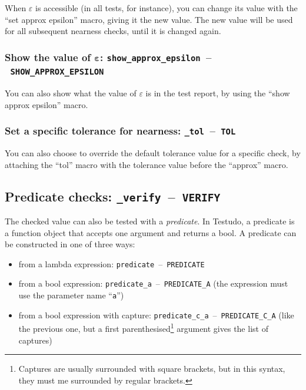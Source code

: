 \documentclass[twoside, a4paper, article]{memoir}
\newcommand*\testudocolor{\color{red!80!blue}}
\newcommand*\testudo[1]{\texttt{\testudocolor{}#1}}
\newcommand*\testudopair[2]{\testudo{#1}~--~\testudo{#2}}
\newcommand\subsectiontestudopair[3]{%
  \subsection[#1]{#1: \testudopair{#2}{#3}}}
\newcommand\subsubsectiontestudopair[3]{%
  \subsubsection[#1]{#1: \testudopair{#2}{#3}}}
\providecommand\typesetexample[1]{%
}
\begin{document}
When $\varepsilon$ is accessible (in all tests, for instance), you can change
its value with the ``set approx epsilon'' macro, giving it the new value.  The
new value will be used for all subsequent nearness checks, until it is changed
again.

\typesetexample{set-approx-epsilon}

\subsubsectiontestudopair{Show the value of $\bm{\varepsilon}$}%
  {show\_approx\_epsilon}{SHOW\_APPROX\_EPSILON}
\label{sec:show-value-epsilon}

You can also show what the value of $\varepsilon$ is in the test report, by
using the ``show approx epsilon'' macro.

\typesetexample{show-approx-epsilon}

\subsubsectiontestudopair{Set a specific tolerance for nearness}%
  {\_tol}{TOL}
\label{sec:specify-tolerance-nearness}

You can also choose to override the default tolerance value for a specific
check, by attaching the ``tol'' macro with the tolerance value before the
``approx'' macro.

\typesetexample{check-approx-tol}


\subsectiontestudopair{Predicate checks}{\_verify}{VERIFY}
\label{sec:predicate-checks}

The checked value can also be tested with a \emph{predicate}.  In Testudo, a
predicate is a function object that accepts one argument and returns a
bool.  A predicate can be constructed in one of three ways:
\begin{itemize}
\item from a lambda expression: \testudopair{predicate}{PREDICATE}

  \typesetexample{predicate}

\item from a bool expression:
  \testudopair{predicate\_a}{PREDICATE\_A} (the expression must use the
  parameter name ``\texttt{a}'')

  \typesetexample{predicate-a}

\item from a bool expression with capture:
  \testudopair{predicate\_c\_a}{PREDICATE\_C\_A} (like the previous one, but a
  first parenthesised\footnote{Captures are usually surrounded with square
    brackets, but in this syntax, they must me surrounded by regular brackets.}
  argument gives the list of captures)

  \typesetexample{predicate-c-a}
\end{itemize}
\end{document}
